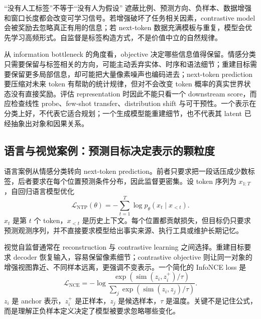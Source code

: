 \begin{warningbox}{“没有人工标签”不等于“没有人为假设”}
遮蔽比例、预测方向、负样本、数据增强和窗口长度都会改变可学习信号。若增强破坏了任务相关因素，contrastive model 会被奖励去忽略真正有用的信息；若 next-token 数据充满模板与重复，模型会优先学习高频形式。自监督是标签构造方式，不是价值中立的自然规律。
\end{warningbox}

从 information bottleneck 的角度看，objective 决定哪些信息值得保留。情感分类只需要保留与标签相关的方向，可能主动丢弃实体、时序和语法细节；重建目标需要保留更多局部信息，却可能把大量像素噪声也编码进去；next-token prediction 要压缩对未来 token 有帮助的统计规律，但对不会改变 token 概率的真实世界状态没有直接奖励。评估 representation 时因此不能只看一个 downstream score，而应检查线性 probe、few-shot transfer、distribution shift 与可干预性。一个表示在分类上好，不代表它适合规划；一个生成模型能重建细节，也不代表其 latent 已经抽象出对象和因果关系。

\subsection{语言与视觉案例：预测目标决定表示的颗粒度}

语言案例从情感分类转向 next-token prediction。前者只要求把一段话压成少数标签，后者要求在每个位置预测条件分布，因此监督更密集。设 token 序列为 $x_{1:T}$，自回归语言模型优化
\[
\mathcal{L}_{\mathrm{NTP}}(\theta)
=-\sum_{t=1}^{T}\log p_{\theta}(x_t\mid x_{<t}).
\]
$x_t$ 是第 $t$ 个 token，$x_{<t}$ 是历史上下文。每个位置都贡献损失，但目标仍只要求预测观测序列，并不直接要求模型给出事实来源、执行工具或维护长期记忆。




视觉自监督通常在 reconstruction 与 contrastive learning 之间选择。重建目标要求 decoder 恢复输入，容易保留像素细节；contrastive objective 则让同一对象的增强视图靠近、不同样本远离，更强调不变表示。一个简化的 InfoNCE loss 是
\[
\mathcal{L}_{\mathrm{NCE}}
=-\log\frac{\exp(\operatorname{sim}(z_i,z_i^+)/\tau)}
{\sum_j \exp(\operatorname{sim}(z_i,z_j)/\tau)}.
\]
$z_i$ 是 anchor 表示，$z_i^+$ 是正样本，$z_j$ 是候选样本，$\tau$ 是温度。关键不是记住公式，而是理解正负样本定义决定了模型被要求忽略哪些变化。

